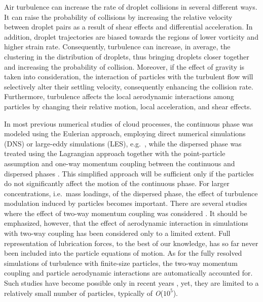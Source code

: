 \documentclass[../thesis.tex]{subfiles}
\begin{document}
Air turbulence can increase the rate of droplet collisions in several different ways. It can raise the probability of collisions by increasing the relative velocity between droplet pairs as a result of shear effects and differential acceleration. In addition, droplet trajectories are biased towards the regions of lower vorticity and higher strain rate. Consequently, turbulence can increase, in average, the clustering in the distribution of droplets, thus bringing droplets closer together and increasing the probability of collision. Moreover, if the effect of gravity is taken into consideration, the interaction of particles with the turbulent flow will selectively alter their settling velocity, consequently enhancing the collision rate. Furthermore, turbulence affects the local aerodynamic interactions among particles by changing their relative motion, local acceleration, and shear effects. 

In most previous numerical studies of cloud processes, the continuous phase was modeled using the Eulerian approach, employing direct numerical simulations (DNS) or large-eddy simulations (LES), e.g.\ \cite{RP17}, while the dispersed phase was treated using the Lagrangian approach together with the point-particle assumption and one-way momentum coupling between the continuous and dispersed phases \citep{RPAGW13,WRGHJ09}. This simplified approach will be sufficient only if the particles do not significantly affect the motion of the continuous phase. For larger concentrations, i.e.\ mass loadings, of the dispersed phase, the effect of turbulence modulation induced by particles becomes important. There are several studies where the effect of two-way momentum coupling was considered \citep{BKM06,MD17,RPW20,RPW20corrigendum}. It should be emphasized, however, that the effect of aerodynamic interaction in simulations with two-way coupling has been considered only to a limited extent. Full representation of lubrication forces, to the best of our knowledge, has so far never been included into the particle equations of motion. As for the fully resolved simulations of turbulence with finite-size particles, the two-way momentum coupling and particle aerodynamic interactions are automatically accounted for. Such studies have become possible only in recent years \citep{DBBCGIMRVW12,GLW13,K16,WPGY16-2,WPGY16}, yet, they are limited to a relatively small number of particles, typically of \textit{O}($10^5$).
\end{document}
